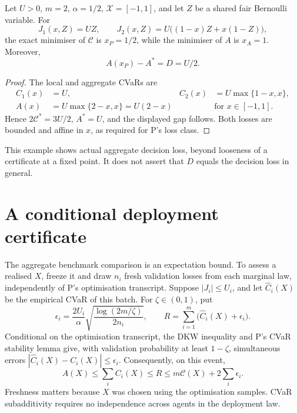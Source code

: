 \documentclass{article}
\begin{document}
\begin{proposition}\label{prop:example}
Let \(U>0\), \(m=2\), \(\alpha=1/2\), \(\mathcal X=[-1,1]\), and let
\(Z\) be a shared fair Bernoulli variable.  For
\[
J_1(x,Z)=UZ,\qquad
J_2(x,Z)=U\bigl((1-x)Z+x(1-Z)\bigr),
\]
the exact minimiser of \(\mathcal C\) is \(x_P=1/2\), while the
minimiser of \(A\) is \(x_A=1\).  Moreover,
\[
A(x_P)-A^*=D=U/2.
\]
\end{proposition}

\begin{proof}
The local and aggregate CVaRs are
\[
\begin{aligned}
C_1(x)&=U, & C_2(x)&=U\max\{1-x,x\},\\
A(x)&=U\max\{2-x,x\}=U(2-x)
&&\text{for }x\in[-1,1].
\end{aligned}
\]
Hence \(2\mathcal C^*=3U/2\), \(A^*=U\), and the displayed
gap follows.  Both losses are bounded and affine in \(x\), as required
for P's loss class.
\end{proof}

This example shows actual aggregate decision loss, beyond looseness of
a certificate at a fixed point.  It does not assert that \(D\) equals
the decision loss in general.

\section{A conditional deployment certificate}

The aggregate benchmark comparison is an expectation bound.  To assess
a realised \(X\), freeze it and draw \(n_i\) fresh validation losses
from each marginal law, independently of P's optimisation transcript.
Suppose \(|J_i|\le U_i\), and let \(\widehat C_i(X)\) be the empirical
CVaR of this batch.  For \(\zeta\in(0,1)\), put
\[
\epsilon_i=\frac{2U_i}{\alpha}
\sqrt{\frac{\log(2m/\zeta)}{2n_i}},
\qquad
R=\sum_{i=1}^m\bigl(\widehat C_i(X)+\epsilon_i\bigr).
\]
Conditional on the optimisation transcript, the DKW inequality and P's
CVaR stability lemma give, with validation probability at least
\(1-\zeta\), simultaneous errors
\(|\widehat C_i(X)-C_i(X)|\le\epsilon_i\).  Consequently, on this
event,
\[
A(X)\le\sum_i C_i(X)\le R
\le m\mathcal C(X)+2\sum_i\epsilon_i.
\]
Freshness matters because \(X\) was chosen using the optimisation
samples.  CVaR subadditivity requires no independence across agents in
the deployment law.
\end{document}
